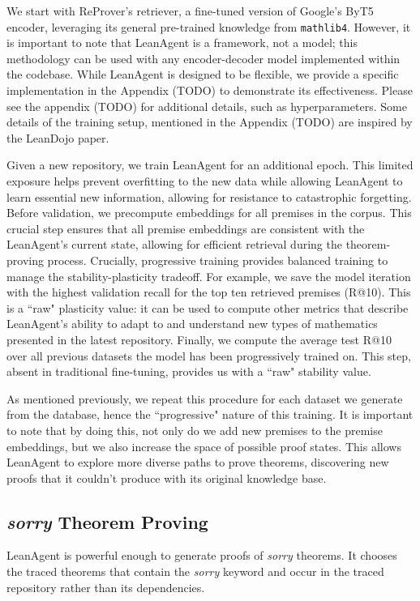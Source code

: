 \documentclass{article} %
\begin{document}
We start with ReProver's retriever, a fine-tuned version of Google's ByT5 encoder, leveraging its general pre-trained knowledge from \texttt{mathlib4}. However, it is important to note that LeanAgent is a framework, not a model; this methodology can be used with any encoder-decoder model implemented within the codebase. While LeanAgent is designed to be flexible, we provide a specific implementation in the Appendix (TODO) to demonstrate its effectiveness. Please see the appendix (TODO) for additional details, such as hyperparameters.  Some details of the training setup, mentioned in the Appendix (TODO) are inspired by the LeanDojo paper. 

Given a new repository, we train LeanAgent for an additional epoch. This limited exposure helps prevent overfitting to the new data while allowing LeanAgent to learn essential new information, allowing for resistance to catastrophic forgetting. Before validation, we precompute embeddings for all premises in the corpus. This crucial step ensures that all premise embeddings are consistent with the LeanAgent's current state, allowing for efficient retrieval during the theorem-proving process. Crucially, progressive training provides balanced training to manage the stability-plasticity tradeoff. For example, we save the model iteration with the highest validation recall for the top ten retrieved premises (R@10). This is a ``raw" plasticity value: it can be used to compute other metrics that describe LeanAgent's ability to adapt to and understand new types of mathematics presented in the latest repository. Finally, we compute the average test R@10 over all previous datasets the model has been progressively trained on. This step, absent in traditional fine-tuning, provides us with a ``raw" stability value.

As mentioned previously, we repeat this procedure for each dataset we generate from the database, hence the ``progressive" nature of this training. It is important to note that by doing this, not only do we add new premises to the premise embeddings, but we also increase the space of possible proof states. This allows LeanAgent to explore more diverse paths to prove theorems, discovering new proofs that it couldn't produce with its original knowledge base.

\subsection{\textit{sorry} Theorem Proving}

LeanAgent is powerful enough to generate proofs of \textit{sorry} theorems. It chooses the traced theorems that contain the \textit{sorry} keyword and occur in the traced repository rather than its dependencies.
\end{document}
